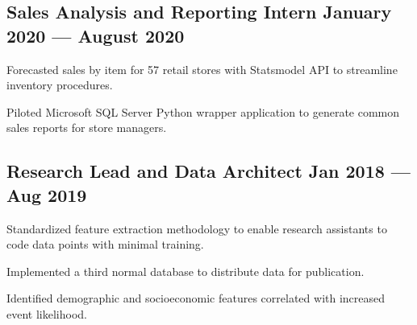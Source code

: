 \documentclass[%
               doublesided,
               paper=a4,
               fontsize=10.5pt
              ]{my-resume}
\begin{document}
{\begin{zitemize}
    \end{zitemize}

    \subsection{{Sales Analysis and Reporting Intern \hfill January 2020 --- August 2020}}
    \footnotesize
    \begin{zitemize}
        \item{Forecasted sales by item for 57 retail stores with Statsmodel API to streamline \\inventory procedures.}
        \item{Piloted Microsoft SQL Server Python wrapper application to generate common sales reports for store managers.} 
    \end{zitemize}

    \subsection{{Research Lead and Data Architect \hfill Jan 2018 --- Aug 2019}}
    \begin{zitemize}
        \footnotesize
        \item{Standardized feature extraction methodology to enable research assistants to code data points with minimal training.}
        \item{Implemented a third normal database to distribute data for publication.}
        \item{Identified demographic and socioeconomic features correlated with increased event likelihood.}
        
    \end{zitemize}

}
\end{document}
